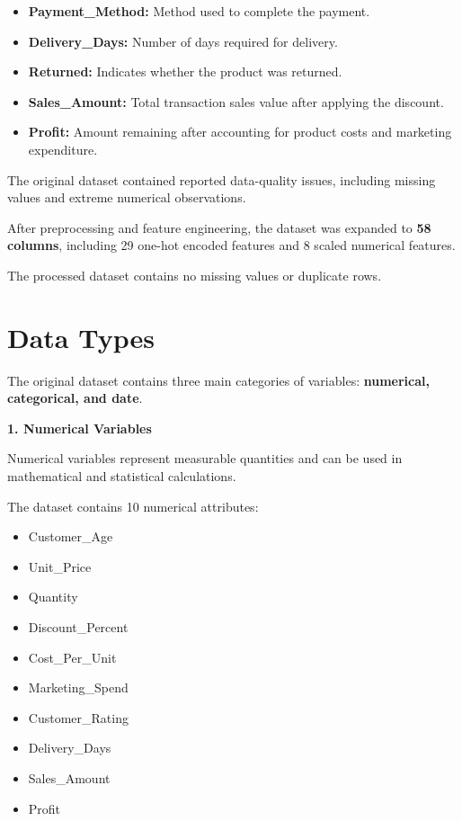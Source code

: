 \documentclass[12pt,a4paper]{report}
\begin{document}
\begin{itemize}
    \item \textbf{Payment\_Method:}
    Method used to complete the payment.

    \item \textbf{Delivery\_Days:}
    Number of days required for delivery.

    \item \textbf{Returned:}
    Indicates whether the product
    was returned.

    \item \textbf{Sales\_Amount:}
    Total transaction sales value
    after applying the discount.

    \item \textbf{Profit:}
    Amount remaining after accounting
    for product costs and marketing
    expenditure.

\end{itemize}

The original dataset contained reported
data-quality issues, including missing
values and extreme numerical observations.

After preprocessing and feature engineering,
the dataset was expanded to
\textbf{58 columns}, including
29 one-hot encoded features and
8 scaled numerical features.

The processed dataset contains
no missing values or duplicate rows.


\section{Data Types}

The original dataset contains three
main categories of variables:
\textbf{numerical, categorical, and date}.

\textbf{1. Numerical Variables}

Numerical variables represent measurable
quantities and can be used in mathematical
and statistical calculations.

The dataset contains 10 numerical attributes:

\begin{itemize}
    \item Customer\_Age
    \item Unit\_Price
    \item Quantity
    \item Discount\_Percent
    \item Cost\_Per\_Unit
    \item Marketing\_Spend
    \item Customer\_Rating
    \item Delivery\_Days
    \item Sales\_Amount
    \item Profit
\end{itemize}
\end{document}
